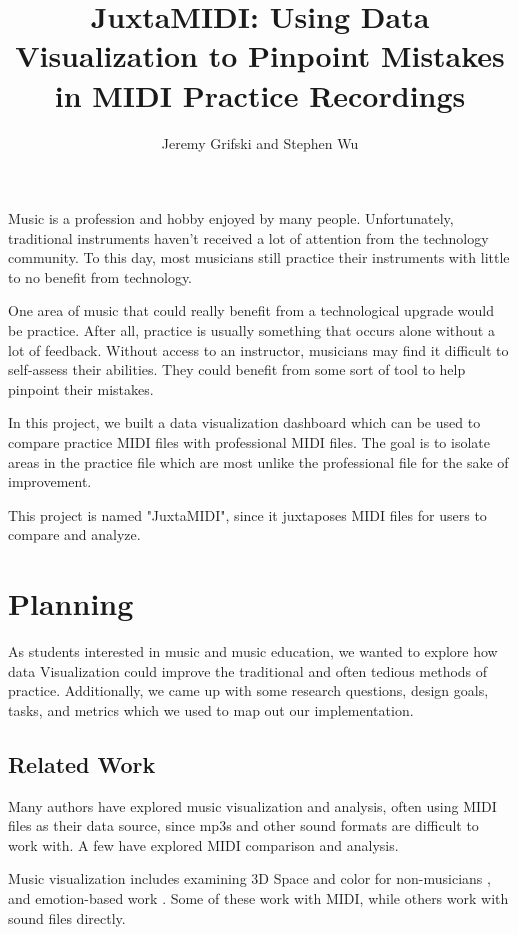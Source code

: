 \documentclass[journal]{vgtc}                %
\title{JuxtaMIDI: Using Data Visualization to Pinpoint Mistakes in MIDI Practice Recordings}
\author{Jeremy Grifski and Stephen Wu}
\begin{document}

\maketitle

Music is a profession and hobby enjoyed by many people. Unfortunately, traditional
instruments haven't received a lot of attention from the technology community. To
this day, most musicians still practice their instruments with little to no
benefit from technology.

One area of music that could really benefit from a technological upgrade would
be practice. After all, practice is usually something that occurs alone without
a lot of feedback. Without access to an instructor, musicians may find it difficult
to self-assess their abilities. They could benefit from some sort of tool
to help pinpoint their mistakes.

In this project, we built a data visualization dashboard which can be used to
compare practice MIDI files with professional MIDI files. The goal is to isolate
areas in the practice file which are most unlike the professional file for the
sake of improvement.

This project is named "JuxtaMIDI", since it juxtaposes MIDI files
for users to compare and analyze.

\section{Planning}

As students interested in music and music education, we wanted to explore how data Visualization
could improve the traditional and often tedious methods of practice. Additionally, we came up with some
research questions, design goals, tasks, and metrics which we used to map
out our implementation.

\subsection{Related Work}

Many authors have explored music visualization and analysis, often using MIDI files
as their data source, since mp3s and other sound formats are difficult to work with. A few have explored MIDI comparison and analysis.

Music visualization includes examining 3D Space and color for non-musicians \cite{visualization},
and emotion-based work \cite{emotion}. Some of these work with MIDI, while others work with sound files directly.
\end{document}
